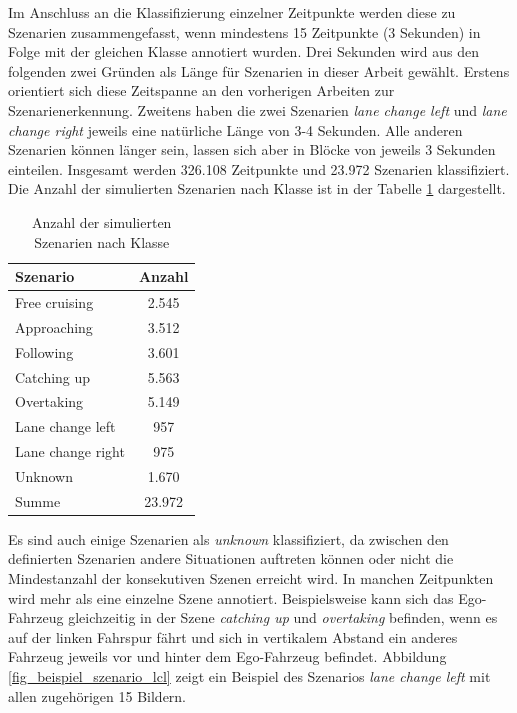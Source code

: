 Im Anschluss an die Klassifizierung einzelner Zeitpunkte werden diese zu Szenarien zusammengefasst, wenn mindestens 15 Zeitpunkte (3 Sekunden) in Folge mit der gleichen Klasse annotiert wurden. Drei Sekunden wird aus den folgenden zwei Gründen als Länge für Szenarien in dieser Arbeit gewählt. Erstens orientiert sich diese Zeitspanne an den vorherigen Arbeiten zur Szenarienerkennung. Zweitens haben die zwei Szenarien \textit{lane change left} und \textit{lane change right} jeweils eine natürliche Länge von 3-4 Sekunden. Alle anderen Szenarien können länger sein, lassen sich aber in Blöcke von jeweils 3 Sekunden einteilen. Insgesamt werden 326.108 Zeitpunkte und 23.972 Szenarien klassifiziert. Die Anzahl der simulierten Szenarien nach Klasse ist in der Tabelle \ref{tab_verteilung_szenarien} dargestellt.

\begin{table}[h]
\centering
\def\arraystretch{1.4}
\begin{tabular}{l c}
\textbf{Szenario} & \textbf{Anzahl} \\
\hline
Free cruising & 2.545 \\
Approaching & 3.512 \\
Following & 3.601 \\
Catching up & 5.563 \\
Overtaking & 5.149 \\
Lane change left & 957 \\
Lane change right & 975 \\
Unknown & 1.670 \\
\hline
Summe & 23.972 \\
\hline
\end{tabular}
\caption{Anzahl der simulierten Szenarien nach Klasse}
\label{tab_verteilung_szenarien}
\end{table}

Es sind auch einige Szenarien als \textit{unknown} klassifiziert, da zwischen den definierten Szenarien andere Situationen auftreten können oder nicht die Mindestanzahl der konsekutiven Szenen erreicht wird. In manchen Zeitpunkten wird mehr als eine einzelne Szene annotiert. Beispielsweise kann sich das Ego-Fahrzeug gleichzeitig in der Szene \textit{catching up} und \textit{overtaking} befinden, wenn es auf der linken Fahrspur fährt und sich in vertikalem Abstand ein anderes Fahrzeug jeweils vor und hinter dem Ego-Fahrzeug befindet. Abbildung \ref{fig_beispiel_szenario_lcl} zeigt ein Beispiel des Szenarios \textit{lane change left} mit allen zugehörigen 15 Bildern.

